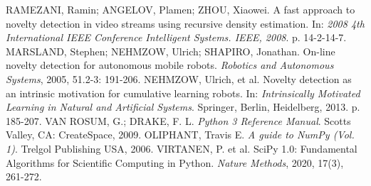 \documentclass[11pt,twoside,openright]{report}
\begin{document}
\begin{thebibliography}{L}
RAMEZANI, Ramin; ANGELOV, Plamen; ZHOU, Xiaowei. A fast approach to novelty detection in video streams using recursive density estimation. In: \textit{2008 4th International IEEE Conference Intelligent Systems. IEEE, 2008}. p. 14-2-14-7.
MARSLAND, Stephen; NEHMZOW, Ulrich; SHAPIRO, Jonathan. On-line novelty detection for autonomous mobile robots. \textit{Robotics and Autonomous Systems}, 2005, 51.2-3: 191-206.
NEHMZOW, Ulrich, et al. Novelty detection as an intrinsic motivation for cumulative learning robots. In: \textit{Intrinsically Motivated Learning in Natural and Artificial Systems}. Springer, Berlin, Heidelberg, 2013. p. 185-207.
VAN ROSUM, G.; DRAKE, F. L. \textit{Python 3 Reference Manual}. Scotts Valley, CA: CreateSpace, 2009.
OLIPHANT, Travis E. \textit{A guide to NumPy (Vol. 1)}. Trelgol Publishing USA, 2006.
VIRTANEN, P. et al.  SciPy 1.0: Fundamental Algorithms for Scientific Computing in Python. \textit{Nature Methods}, 2020, 17(3), 261-272.
\end{thebibliography}
\end{document}
